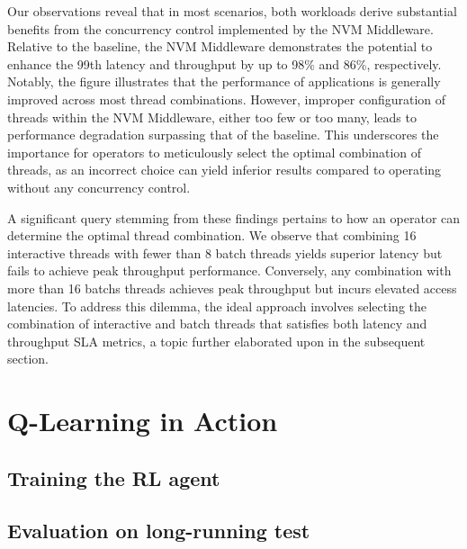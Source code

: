 Our observations reveal that in most scenarios, both workloads derive substantial benefits from the concurrency control implemented by the NVM Middleware. Relative to the baseline, the NVM Middleware demonstrates the potential to enhance the 99th latency and throughput by up to 98\% and 86\%, respectively. Notably, the figure illustrates that the performance of applications is generally improved across most thread combinations. However, improper configuration of threads within the NVM Middleware, either too few or too many, leads to performance degradation surpassing that of the baseline. This underscores the importance for operators to meticulously select the optimal combination of threads, as an incorrect choice can yield inferior results compared to operating without any concurrency control.

A significant query stemming from these findings pertains to how an operator can determine the optimal thread combination. We observe that combining 16 interactive threads with fewer than 8 batch threads yields superior latency but fails to achieve peak throughput performance. Conversely, any combination with more than 16 batchs threads achieves peak throughput but incurs elevated access latencies. To address this dilemma, the ideal approach involves selecting the combination of interactive and batch threads that satisfies both latency and throughput SLA metrics, a topic further elaborated upon in the subsequent section.

\section{Q-Learning in Action}

\subsection*{Training the RL agent}

\subsection*{Evaluation on long-running test}
